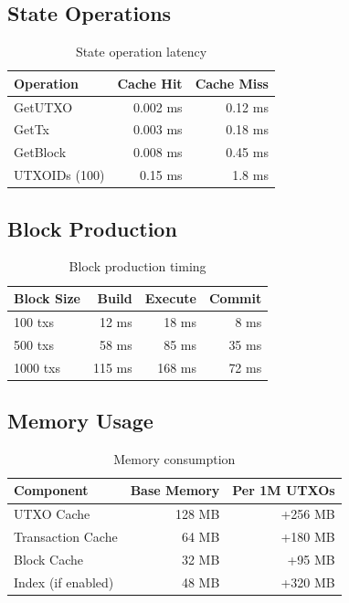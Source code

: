 \documentclass[11pt,a4paper]{article}
\begin{document}
\subsection{State Operations}

\begin{table}[h]
\centering
\begin{tabular}{lrr}
\toprule
\textbf{Operation} & \textbf{Cache Hit} & \textbf{Cache Miss} \\
\midrule
GetUTXO & 0.002 ms & 0.12 ms \\
GetTx & 0.003 ms & 0.18 ms \\
GetBlock & 0.008 ms & 0.45 ms \\
UTXOIDs (100) & 0.15 ms & 1.8 ms \\
\bottomrule
\end{tabular}
\caption{State operation latency}
\end{table}

\subsection{Block Production}

\begin{table}[h]
\centering
\begin{tabular}{lrrr}
\toprule
\textbf{Block Size} & \textbf{Build} & \textbf{Execute} & \textbf{Commit} \\
\midrule
100 txs & 12 ms & 18 ms & 8 ms \\
500 txs & 58 ms & 85 ms & 35 ms \\
1000 txs & 115 ms & 168 ms & 72 ms \\
\bottomrule
\end{tabular}
\caption{Block production timing}
\end{table}

\subsection{Memory Usage}

\begin{table}[h]
\centering
\begin{tabular}{lrr}
\toprule
\textbf{Component} & \textbf{Base Memory} & \textbf{Per 1M UTXOs} \\
\midrule
UTXO Cache & 128 MB & +256 MB \\
Transaction Cache & 64 MB & +180 MB \\
Block Cache & 32 MB & +95 MB \\
Index (if enabled) & 48 MB & +320 MB \\
\bottomrule
\end{tabular}
\caption{Memory consumption}
\end{table}
\end{document}
